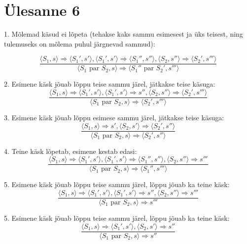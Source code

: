 \section{Ülesanne 6}

1. Mõlemad käsud ei lõpeta (tehakse kaks sammu esimesest ja üks teisest,
ning tulemuseks on mõlema puhul järgnevad sammud):

\[
  \frac{
    \langle S_1, s \rangle \Rightarrow \langle S_1', s' \rangle
    ,
    \langle S_1', s' \rangle \Rightarrow \langle S_1'', s'' \rangle
    ,
    \langle S_2, s'' \rangle \Rightarrow \langle S_2', s''' \rangle
  }{
    \langle S_1 \text{\ par\ } S_2, s \rangle \Rightarrow
    \langle S_1'' \text{\ par\ } S_2', s''' \rangle
  }
\]


2. Esimene käsk jõuab lõppu teise sammu järel, jätkakse teise käsuga:
\[
  \frac{
    \langle S_1, s \rangle \Rightarrow \langle S_1', s' \rangle
    ,
    \langle S_1', s' \rangle \Rightarrow s''
    ,
    \langle S_2, s'' \rangle \Rightarrow \langle S_2', s''' \rangle
  }{
    \langle S_1 \text{\ par\ } S_2, s \rangle \Rightarrow
    \langle S_2', s''' \rangle
  }
\]

3. Esimene käsk jõuab lõppu esimese sammu järel, jätkakse teise käsuga:
\[
  \frac{
    \langle S_1, s \rangle \Rightarrow s'
    ,
    \langle S_2, s' \rangle \Rightarrow \langle S_2', s'' \rangle
  }{
    \langle S_1 \text{\ par\ } S_2, s \rangle \Rightarrow
    \langle S_2', s'' \rangle
  }
\]

4. Teine käsk lõpetab, esimene kestab edasi:
\[
  \frac{
    \langle S_1, s \rangle \Rightarrow \langle S_1', s' \rangle
    ,
    \langle S_1', s' \rangle \Rightarrow \langle S_1'', s'' \rangle
    ,
    \langle S_2, s'' \rangle \Rightarrow s'''
  }{
    \langle S_1 \text{\ par\ } S_2, s \rangle \Rightarrow
    \langle S_1'', s''' \rangle
  }
\]

5. Esimene käsk jõuab lõppu teise sammu järel, lõppu jõuab ka teine käsk:
\[
  \frac{
    \langle S_1, s \rangle \Rightarrow \langle S_1', s' \rangle
    ,
    \langle S_1', s' \rangle \Rightarrow s''
    ,
    \langle S_2, s'' \rangle \Rightarrow s'''
  }{
    \langle S_1 \text{\ par\ } S_2, s \rangle \Rightarrow
    s'''
  }
\]

5. Esimene käsk jõuab lõppu teise sammu järel, lõppu jõuab ka teine käsk:
\[
  \frac{
    \langle S_1, s \rangle \Rightarrow \langle S_1', s' \rangle
    ,
    \langle S_2, s' \rangle \Rightarrow s''
  }{
    \langle S_1 \text{\ par\ } S_2, s \rangle \Rightarrow
    s''
  }
\]
